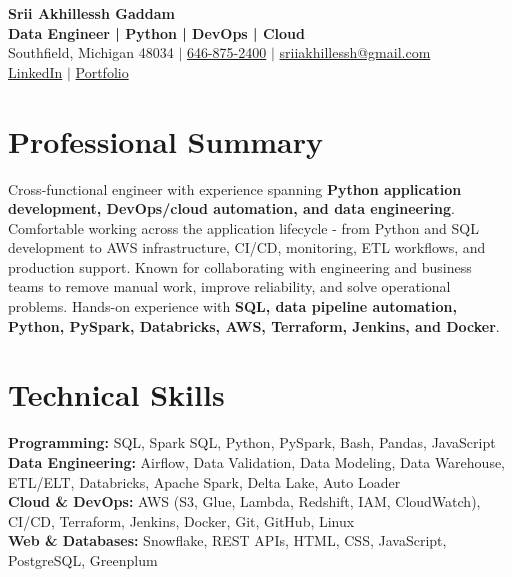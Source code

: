 \documentclass[letterpaper,10pt]{article}
\begin{document}
\fontsize{9.35pt}{10.45pt}\selectfont

\begin{center}
    {\LARGE \textbf{Srii Akhillessh Gaddam}} \\[-1pt]
    \textbf{Data Engineer | Python | DevOps | Cloud} \\[2pt]
    Southfield, Michigan 48034 $|$
    \href{tel:6468752400}{646-875-2400} $|$
    \href{mailto:sriiakhillessh@gmail.com}{sriiakhillessh@gmail.com} \\[1pt]
    \href{https://www.linkedin.com/in/srii-akhiilessh-gaddam-b48668191/}{LinkedIn} $|$
    \href{https://sriiakhillesshg.github.io/portfolio/}{Portfolio}
\end{center}
\vspace{-8pt}

\section{Professional Summary}
\small{Cross-functional engineer with experience spanning \textbf{Python application development, DevOps/cloud automation, and data engineering}. Comfortable working across the application lifecycle - from Python and SQL development to AWS infrastructure, CI/CD, monitoring, ETL workflows, and production support. Known for collaborating with engineering and business teams to remove manual work, improve reliability, and solve operational problems. Hands-on experience with \textbf{SQL, data pipeline automation, Python, PySpark, Databricks, AWS, Terraform, Jenkins, and Docker}.}

\section{Technical Skills}
\small{
\textbf{Programming:} SQL, Spark SQL, Python, PySpark, Bash, Pandas, JavaScript \\
\textbf{Data Engineering:} Airflow, Data Validation, Data Modeling, Data Warehouse, ETL/ELT, Databricks, Apache Spark, Delta Lake, Auto Loader \\
\textbf{Cloud \& DevOps:} AWS (S3, Glue, Lambda, Redshift, IAM, CloudWatch), CI/CD, Terraform, Jenkins, Docker, Git, GitHub, Linux \\
\textbf{Web \& Databases:} Snowflake, REST APIs, HTML, CSS, JavaScript, PostgreSQL, Greenplum
}
\end{document}
